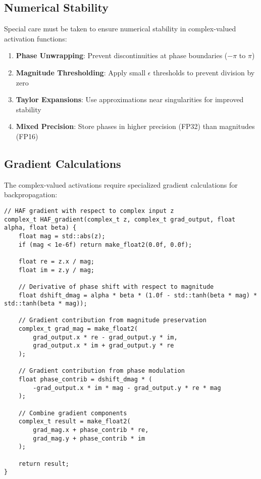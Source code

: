 \subsection{Numerical Stability}

Special care must be taken to ensure numerical stability in complex-valued activation functions:

\begin{enumerate}
    \item \textbf{Phase Unwrapping}: Prevent discontinuities at phase boundaries ($-\pi$ to $\pi$)
    \item \textbf{Magnitude Thresholding}: Apply small $\epsilon$ thresholds to prevent division by zero
    \item \textbf{Taylor Expansions}: Use approximations near singularities for improved stability
    \item \textbf{Mixed Precision}: Store phases in higher precision (FP32) than magnitudes (FP16)
\end{enumerate}

\subsection{Gradient Calculations}

The complex-valued activations require specialized gradient calculations for backpropagation:

\begin{tcolorbox}[colback=CodeBackground, colframe=DarkGray, title=HAF Gradient Calculation, fonttitle=\bfseries]
\begin{verbatim}
// HAF gradient with respect to complex input z
complex_t HAF_gradient(complex_t z, complex_t grad_output, float alpha, float beta) {
    float mag = std::abs(z);
    if (mag < 1e-6f) return make_float2(0.0f, 0.0f);
    
    float re = z.x / mag;
    float im = z.y / mag;
    
    // Derivative of phase shift with respect to magnitude
    float dshift_dmag = alpha * beta * (1.0f - std::tanh(beta * mag) * std::tanh(beta * mag));
    
    // Gradient contribution from magnitude preservation
    complex_t grad_mag = make_float2(
        grad_output.x * re - grad_output.y * im,
        grad_output.x * im + grad_output.y * re
    );
    
    // Gradient contribution from phase modulation
    float phase_contrib = dshift_dmag * (
        -grad_output.x * im * mag - grad_output.y * re * mag
    );
    
    // Combine gradient components
    complex_t result = make_float2(
        grad_mag.x + phase_contrib * re,
        grad_mag.y + phase_contrib * im
    );
    
    return result;
}
\end{verbatim}
\end{tcolorbox}

